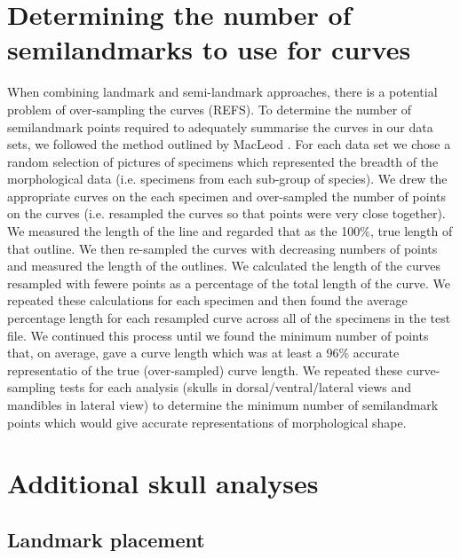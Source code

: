 \documentclass[12pt,a4paper]{article}
\begin{document}
\section{Determining the number of semilandmarks to use for curves}
When combining landmark and semi-landmark approaches, there is a potential problem of over-sampling the curves (REFS). To determine the number of semilandmark points required to adequately summarise the curves in our data sets,  we followed the method outlined by MacLeod \citeyearpar{MacLeod2012}. 
For each data set we chose a random selection of pictures of specimens which represented the breadth of the morphological data (i.e. specimens from each sub-group of species).  We drew the appropriate curves on the each specimen and over-sampled the number of points on the curves (i.e. resampled the curves so that points were very close together). 
We measured the length of the line and regarded that as the 100\%, true length of that outline. We then re-sampled the curves with decreasing numbers of points and measured the length of the outlines. We calculated the length of the curves resampled with fewere points as a percentage of the total length of the curve. We repeated these calculations for each specimen and then found the average percentage length for each resampled curve across all of the specimens in the test file. We continued this process until we found the minimum number of points that, on average, gave a curve length which was at least a 96\% accurate representatio of the true (over-sampled) curve length.  
We repeated these curve-sampling tests for each analysis (skulls in dorsal/ventral/lateral views and mandibles in lateral view) to determine the minimum number of semilandmark points which would give accurate representations of morphological shape.

\section{Additional skull analyses}

\subsection{Landmark placement}
\end{document}
